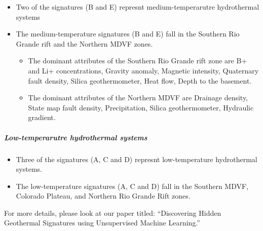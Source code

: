 \documentclass[11pt]{article}
\providecommand{\tightlist}{%
      \setlength{\itemsep}{0pt}\setlength{\parskip}{0pt}}
\begin{document}
\begin{itemize}
\tightlist
\item
  Two of the signatures (B and E) represnt medium-temperarutre
  hydrothermal systems
\item
  The medium-temperature signatures (B and E) fall in the Southern Rio
  Grande rift and the Northern MDVF zones.

  \begin{itemize}
  \tightlist
  \item
    The dominant attributes of the Southern Rio Grande rift zone are B+
    and Li+ concentrations, Gravity anomaly, Magnetic intensity,
    Quaternary fault density, Silica geothermometer, Heat flow, Depth to
    the basement.
  \item
    The dominant attributes of the Northern MDVF are Drainage density,
    State map fault density, Precipitation, Silica geothermometer,
    Hydraulic gradient.
  \end{itemize}
\end{itemize}

\hypertarget{low-temperarutre-hydrothermal-systems}{%
\subparagraph{Low-temperarutre hydrothermal
systems}\label{low-temperarutre-hydrothermal-systems}}

\begin{itemize}
\tightlist
\item
  Three of the signatures (A, C and D) represnt low-temperature
  hydrothermal systems.
\item
  The low-temperature signatures (A, C and D) fall in the Southern MDVF,
  Colorado Plateau, and Northern Rio Grande Rift zones.
\end{itemize}

For more details, please look at our paper titled: ``Discovering Hidden
Geothermal Signatures using Unsupervised Machine Learning.''


    
    
    
\end{document}
